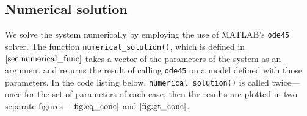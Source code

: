 \subsection{Numerical solution}\label{numerical-solution}

We solve the system numerically by employing the use of MATLAB's
\texttt{ode45} solver. The function \texttt{numerical\_solution()},
which is defined in \(\ref{sec:numerical_func}\) takes a vector of the
parameters of the system as an argument and returns the result of
calling \texttt{ode45} on a model defined with those parameters. In the
code listing below, \texttt{numerical\_solution()} is called
twice---once for the set of parameters of each case, then the results
are plotted in two separate figures---\(\autoref{fig:eq_conc}\) and
\(\autoref{fig:gt_conc}\).

\begin{Shaded}
\begin{Highlighting}[]
\NormalTok{[}\OperatorTok{,} \NormalTok{] }\OperatorTok{=} \NormalTok{(}\NormalTok{)}\OperatorTok{;}
\NormalTok{[}\OperatorTok{,} \NormalTok{] }\OperatorTok{=} \NormalTok{(}\NormalTok{)}\OperatorTok{;}

\OperatorTok{;}
\NormalTok{(}\OperatorTok{,} \NormalTok{)}\OperatorTok{;}
\NormalTok{(}\OperatorTok{,} \NormalTok{)}\OperatorTok{;}
\NormalTok{(}\NormalTok{)}\OperatorTok{;}
\NormalTok{(}\NormalTok{)}\OperatorTok{;}
\NormalTok{(}\NormalTok{)}\OperatorTok{;}
 \OperatorTok{;}

\OperatorTok{;}
\NormalTok{(}\OperatorTok{,} \NormalTok{)}\OperatorTok{;}
\NormalTok{(}\OperatorTok{,} \NormalTok{)}\OperatorTok{;}
\NormalTok{(}\NormalTok{)}\OperatorTok{;}
\NormalTok{(}\NormalTok{)}\OperatorTok{;}
\NormalTok{(}\NormalTok{)}\OperatorTok{;}
 \OperatorTok{;}
\end{Highlighting}
\end{Shaded}

